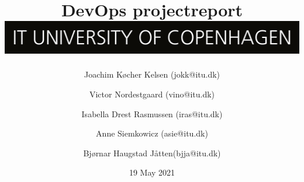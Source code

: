 \documentclass{article}
\title{DevOps projectreport \\[2ex] \includegraphics[scale=0.1]{images/ITU_logo_UK.jpg}}
\author{Joachim Køcher Kelsen (jokk@itu.dk) \and Victor Nordestgaard (vino@itu.dk) \and Isabella Drest Rasmussen (iras@itu.dk) \and Anne Siemkowicz (asie@itu.dk) \and Bjørnar Haugstad Jåtten(bjja@itu.dk)}
\date{19 May 2021}
\begin{document}
{}

\maketitle

\newpage

\tableofcontents

\newpage



\newpage



\newpage



\newpage



\newpage


\end{document}
